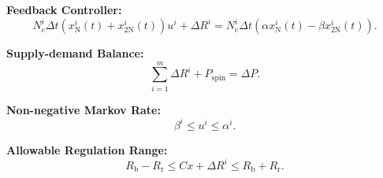 \documentclass[journal]{IEEEtran}
\begin{document}
\textbf{Feedback Controller:}
\begin{equation}
N_{\textrm{c}}^{i}\Delta t (x_{\textrm{N}}^{i}(t)+x_{\textrm{2N}}^{i}(t)) u^{i}+\Delta R^{i}=N_{\textrm{c}}^{i}\Delta t (\alpha x_{\textrm{N}}^{i}(t)-\beta x_{\textrm{2N}}^{i}(t)).
\end{equation}

\textbf{Supply-demand Balance:}
\begin{equation}
\sum\limits_{i=1}^{m}\Delta R^{i} + P_{\textrm{spin}} = \Delta P.
\end{equation}

\textbf{Non-negative Markov Rate:}
\begin{equation}
\beta^{i} \leq u^{i} \leq \alpha^{i}.
\end{equation}

\textbf{Allowable Regulation Range:}
\begin{equation}
R_{\textrm{b}}-R_{\textrm{r}}\leq Cx + \Delta R^{i} \leq R_{\textrm{b}}+R_{\textrm{r}}.
\end{equation}
\end{document}
